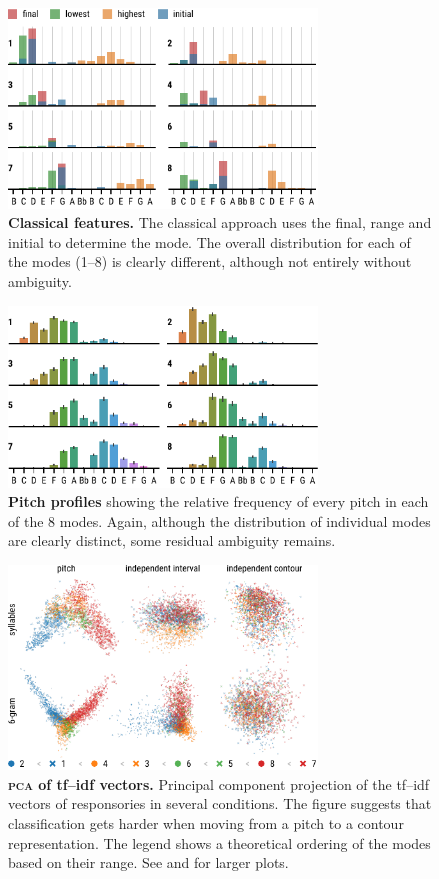 \documentclass{article}
\begin{document}
\begin{figure}
    \centering
    \includegraphics[width=8.2cm]{figs/fig02-classical-features.pdf}
    \caption{%
        \textbf{Classical features.}
        The classical approach uses the final, range and initial to determine the mode.
        The overall distribution for each of the modes (1--8) is clearly different, although not entirely without ambiguity.
        \label{fig:classical-features}
    }
\end{figure}
\begin{figure}
    \centering
    \includegraphics[width=8.2cm]{figs/fig03-pitch-profiles.pdf}
    \caption{%
        \textbf{Pitch profiles}
        showing the relative frequency of every pitch in each of the 8 modes.
        Again, although the distribution of individual modes are clearly distinct, some residual ambiguity remains.
        \label{fig:pitch-profile}
    }
\end{figure}
\begin{figure}
    \centering
    \includegraphics[width=8.2cm]{figs/fig04-pca-embeddings.pdf}
    \caption{%
        \textbf{\textsc{pca} of tf--idf vectors.}
        Principal component projection of the tf--idf vectors of responsories in several conditions.
        The figure suggests that classification gets harder when moving from a pitch to a contour representation.
        The legend shows a theoretical ordering of the modes based on their range. See  and  for larger plots.
        \label{fig:embeddings}
    }
\end{figure}
\end{document}
